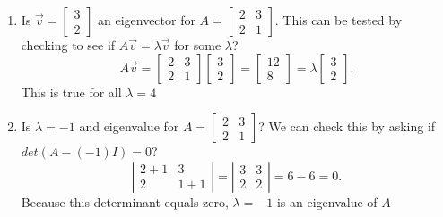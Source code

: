 \begin{eg}
  \begin{enumerate}
    \item Is $\vec{v}=\begin{bmatrix} 3\\2 \end{bmatrix}$ an eigenvector for $A=\begin{bmatrix} 2&3\\2&1 \end{bmatrix} $. This can be tested by checking to see if $A\vec{v}=\lambda\vec{v}$ for some $\lambda$?\[
      A\vec{v}=\begin{bmatrix} 2&3\\2&1 \end{bmatrix} \begin{bmatrix} 3\\2 \end{bmatrix} =\begin{bmatrix} 12\\8 \end{bmatrix} =\lambda\begin{bmatrix} 3\\2 \end{bmatrix} 
    .\] This is true for all $\lambda=4$
    \item Is $\lambda=-1$ and eigenvalue for $A=\begin{bmatrix} 2&3\\2&1 \end{bmatrix} $? We can check this by asking if $det(A-(-1)I)=0$?\[
      \left| \begin{matrix} 2+1&3\\2&1+1 \end{matrix} \right| =\left| \begin{matrix} 3&3\\2&2 \end{matrix} \right| =6-6=0
    .\] Because this determinant equals zero, $\lambda=-1$ is an eigenvalue of $A$
  \end{enumerate}
\end{eg}

